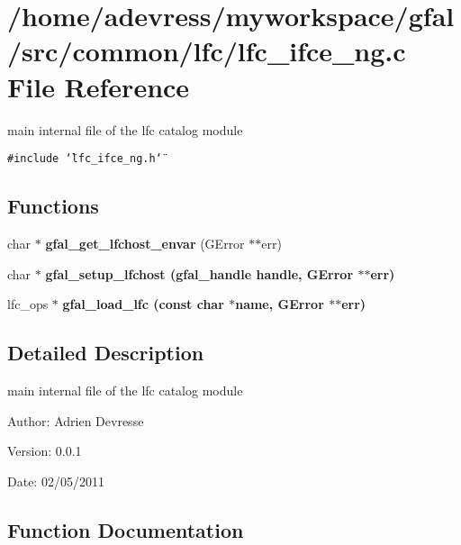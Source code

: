 \section{/home/adevress/myworkspace/gfal/src/common/lfc/lfc\_\-ifce\_\-ng.c File Reference}
\label{lfc__ifce__ng_8c}
main internal file of the lfc catalog module 

{\tt \#include \char`\"{}lfc\_\-ifce\_\-ng.h\char`\"{}}\par
\subsection*{Functions}
\begin{CompactItemize}
\item 
char $\ast$ \textbf{gfal\_\-get\_\-lfchost\_\-envar} (GError $\ast$$\ast$err)\label{lfc__ifce__ng_8c_9a5b8e8e30853b920e3bbe41062e1d25}

\item 
char $\ast$ \bf{gfal\_\-setup\_\-lfchost} (gfal\_\-handle handle, GError $\ast$$\ast$err)
\item 
lfc\_\-ops $\ast$ \bf{gfal\_\-load\_\-lfc} (const char $\ast$name, GError $\ast$$\ast$err)
\end{CompactItemize}


\subsection{Detailed Description}
main internal file of the lfc catalog module 

\begin{Desc}
\item[Author:]Adrien Devresse \end{Desc}
\begin{Desc}
\item[Version:]0.0.1 \end{Desc}
\begin{Desc}
\item[Date:]02/05/2011 \end{Desc}


\subsection{Function Documentation}
